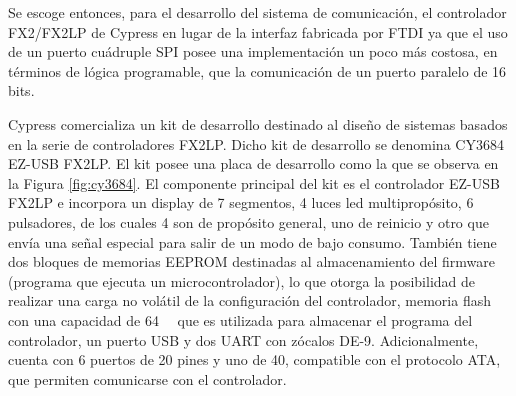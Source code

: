 Se escoge entonces, para el desarrollo del sistema de comunicación, el controlador FX2/FX2LP de Cypress en lugar de la interfaz fabricada por FTDI ya que el uso de un puerto cuádruple SPI posee una implementación un poco más costosa, en términos de lógica programable, que la comunicación de un puerto paralelo de 16 bits.

Cypress comercializa un kit de desarrollo destinado al diseño de sistemas basados en la serie de controladores FX2LP. Dicho kit de desarrollo se denomina CY3684 EZ-USB FX2LP. El kit posee una placa de desarrollo como la que se observa en la Figura \ref{fig:cy3684}. El componente principal del kit es el controlador EZ-USB FX2LP e incorpora un display de 7 segmentos, 4 luces led multipropósito, 6 pulsadores, de los cuales 4 son de propósito general, uno de reinicio y otro que envía una señal especial para salir de un modo de bajo consumo. También tiene dos bloques de memorias EEPROM destinadas al almacenamiento del firmware (programa que ejecuta un microcontrolador), lo que otorga la posibilidad de realizar una carga no volátil de la configuración del controlador, memoria flash con una capacidad de \SI{64}{\kilo\byte} que es utilizada para almacenar el programa del controlador, un puerto USB y dos UART con zócalos DE-9. Adicionalmente, cuenta con 6 puertos de 20 pines y uno de 40, compatible con el protocolo ATA, que permiten comunicarse con el controlador.
 

